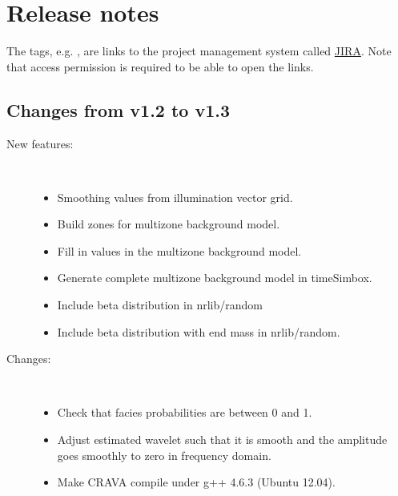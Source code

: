 \chapter{Release notes}
The tags, e.g. , are links to the \crava project management
system called
\href{http://www.atlassian.com/software/jira/}{JIRA}.
 Note that access permission is
required to be able to open the links.

\section{Changes from v1.2 to v1.3}

\begin{description}
\item [New features:] \mbox{ }
  \begin{itemize}
    \item Smoothing values from illumination vector grid. 
    \item Build zones for multizone background model. 
    \item Fill in values in the multizone background model. 
    \item Generate complete multizone background model in timeSimbox. 
    \item Include beta distribution in nrlib/random 
    \item Include beta distribution with end mass in nrlib/random. 
 \end{itemize}

\item [Changes:] \mbox{ }
  \begin{itemize}
   \item Check that facies probabilities are between 0 and 1. 
   \item Adjust estimated wavelet such that it is smooth and the amplitude goes smoothly to zero in frequency domain. 
   \item Make CRAVA compile under g++ 4.6.3 (Ubuntu 12.04). 
 \end{itemize}


\end{description}

